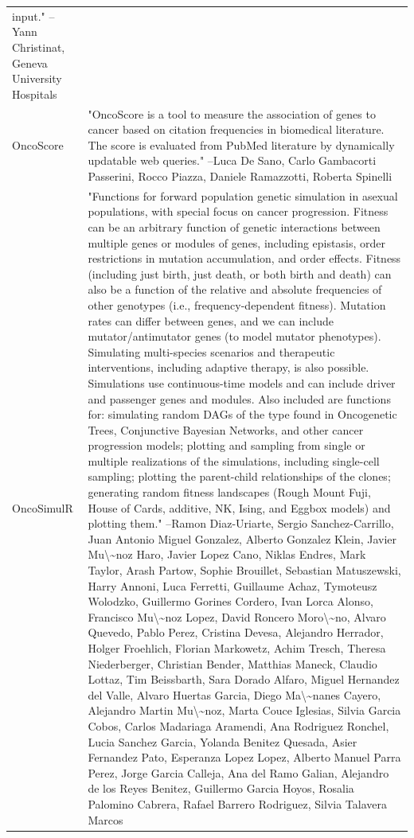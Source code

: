 \documentclass[]{article}
\begin{document}
\begin{longtable}[t]{l>{\raggedright\arraybackslash}p{25em}}
input." --Yann Christinat, Geneva University Hospitals\\
\addlinespace
OncoScore & "OncoScore is a tool to measure the association of genes to
cancer based on citation frequencies in biomedical literature.
The score is evaluated from PubMed literature by dynamically
updatable web queries." --Luca De Sano, Carlo Gambacorti Passerini, Rocco Piazza, Daniele Ramazzotti, Roberta Spinelli\\
OncoSimulR & "Functions for forward population genetic simulation in
asexual populations, with special focus on cancer progression.
Fitness can be an arbitrary function of genetic interactions
between multiple genes or modules of genes, including
epistasis, order restrictions in mutation accumulation, and
order effects. Fitness (including just birth, just death, or
both birth and death) can also be a function of the relative
and absolute frequencies of other genotypes (i.e.,
frequency-dependent fitness). Mutation rates can differ between
genes, and we can include mutator/antimutator genes (to model
mutator phenotypes). Simulating multi-species scenarios and
therapeutic interventions, including adaptive therapy, is also
possible. Simulations use continuous-time models and can
include driver and passenger genes and modules. Also included
are functions for: simulating random DAGs of the type found in
Oncogenetic Trees, Conjunctive Bayesian Networks, and other
cancer progression models; plotting and sampling from single or
multiple realizations of the simulations, including single-cell
sampling; plotting the parent-child relationships of the
clones; generating random fitness landscapes (Rough Mount Fuji,
House of Cards, additive, NK, Ising, and Eggbox models) and
plotting them." --Ramon Diaz-Uriarte, Sergio Sanchez-Carrillo, Juan Antonio Miguel Gonzalez, Alberto Gonzalez Klein, Javier Mu\textbackslash{}\textasciitilde{}noz Haro, Javier Lopez Cano, Niklas Endres, Mark Taylor, Arash Partow, Sophie Brouillet, Sebastian Matuszewski, Harry Annoni, Luca Ferretti, Guillaume Achaz, Tymoteusz Wolodzko, Guillermo Gorines Cordero, Ivan Lorca Alonso, Francisco Mu\textbackslash{}\textasciitilde{}noz Lopez, David Roncero Moro\textbackslash{}\textasciitilde{}no, Alvaro Quevedo, Pablo Perez, Cristina Devesa, Alejandro Herrador, Holger Froehlich, Florian Markowetz, Achim Tresch, Theresa Niederberger, Christian Bender, Matthias Maneck, Claudio Lottaz, Tim Beissbarth, Sara Dorado Alfaro, Miguel Hernandez del Valle, Alvaro Huertas Garcia, Diego Ma\textbackslash{}\textasciitilde{}nanes Cayero, Alejandro Martin Mu\textbackslash{}\textasciitilde{}noz, Marta Couce Iglesias, Silvia Garcia Cobos, Carlos Madariaga Aramendi, Ana Rodriguez Ronchel, Lucia Sanchez Garcia, Yolanda Benitez Quesada, Asier Fernandez Pato, Esperanza Lopez Lopez, Alberto Manuel Parra Perez, Jorge Garcia Calleja, Ana del Ramo Galian, Alejandro de los Reyes Benitez, Guillermo Garcia Hoyos, Rosalia Palomino Cabrera, Rafael Barrero Rodriguez, Silvia Talavera Marcos\\

\end{longtable}
\end{document}

